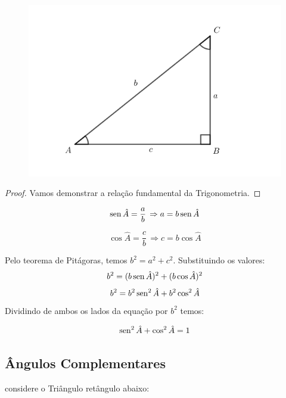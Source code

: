 \begin{figure}[H]
	\centering
	
	\includegraphics[scale=3.5]{imagens/triangulo-retangulo.png}

\end{figure}

\newtheorem{proof}{Demonstração}
\begin{proof}
Vamos demonstrar a relação fundamental da Trigonometria.
\end{proof}

$$\operatorname{sen}\hat{A} = \dfrac{a}{b} \, \Rightarrow a = b \operatorname{sen}\hat{A} $$


$$\cos \hat{A} = \dfrac{c}{b} \, \Rightarrow c = b \cos \hat{A}$$

Pelo teorema de Pitágoras, temos $ b^{2}=a^{2}+c^{2}$. Substituindo os valores:
$$ b^{2}=( b \operatorname{sen}\hat{A} )^{2}+(b \cos \hat{A})^{2}$$
$$b^{2}= b^{2} \operatorname{sen}^{2}\hat{A} +b^{2} \cos^{2} \hat{A}$$
Dividindo de ambos os lados da equação por $ b^{2}$ temos:

$$\operatorname{sen}^{2}\hat{A} + \cos^{2} \hat{A} = 1 $$

\subsection{Ângulos Complementares}


considere o Triângulo retângulo abaixo:

